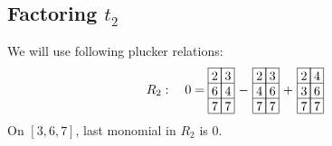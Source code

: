 {\subsection{Factoring \(t_2\)}


We will use following plucker relations:
\begin{align*}
{\def\lr#1{\multicolumn{1}{|@{\hspace{.6ex}}c@{\hspace{.6ex}}|}{\raisebox{-.3ex}{$#1$}}}
\raisebox{-.6ex}{$R_2 :\ \ \ 0 = \begin{array}[c]{*{2}c}\cline{1-2}
\lr{2}&\lr{3}\\\cline{1-2}
\lr{6}&\lr{4}\\\cline{1-2}
\lr{7}&\lr{7}\\\cline{1-2}
\end{array}$}
}
{\def\lr#1{\multicolumn{1}{|@{\hspace{.6ex}}c@{\hspace{.6ex}}|}{\raisebox{-.3ex}{$#1$}}}
\raisebox{-.6ex}{$\ -\ \begin{array}[c]{*{2}c}\cline{1-2}
\lr{2}&\lr{3}\\\cline{1-2}
\lr{4}&\lr{6}\\\cline{1-2}
\lr{7}&\lr{7}\\\cline{1-2}
\end{array}$}
}
{\def\lr#1{\multicolumn{1}{|@{\hspace{.6ex}}c@{\hspace{.6ex}}|}{\raisebox{-.3ex}{$#1$}}}
\raisebox{-.6ex}{$\ +\ \begin{array}[c]{*{2}c}\cline{1-2}
\lr{2}&\lr{4}\\\cline{1-2}
\lr{3}&\lr{6}\\\cline{1-2}
\lr{7}&\lr{7}\\\cline{1-2}
\end{array}$}
}
\end{align*}
On \([3,6,7]\), last monomial in \(R_2\) is \(0\).

}

